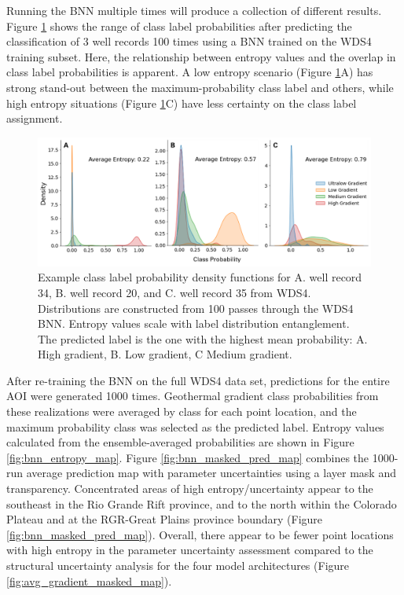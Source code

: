 Running the BNN multiple times will produce a collection of different results. Figure \ref{fig:bnn_class_pdfs} shows the range of class label probabilities after predicting the classification of 3 well records 100 times using a BNN trained on the WDS4 training subset. Here, the relationship between entropy values and the overlap in class label probabilities is apparent. A low entropy scenario (Figure \ref{fig:bnn_class_pdfs}A) has strong stand-out between the maximum-probability class label and others, while high entropy situations (Figure \ref{fig:bnn_class_pdfs}C) have less certainty on the class label assignment.

\begin{figure}[!htp]
\centering
\includegraphics[width=\textwidth]{templates/images/Figure-BNN_100trials_WDS4.png}
\caption[Bayesian neural network class pdfs]{Example class label probability density functions for A. well record 34, B. well record 20, and C. well record 35 from WDS4. Distributions are constructed from 100 passes through the WDS4 BNN. Entropy values scale with label distribution entanglement. The predicted label is the one with the highest mean probability: A. High gradient, B. Low gradient, C Medium gradient.}
\label{fig:bnn_class_pdfs}
\end{figure}

After re-training the BNN on the full WDS4 data set, predictions for the entire AOI were generated 1000 times. Geothermal gradient class probabilities from these realizations were averaged by class for each point location, and the maximum probability class was selected as the predicted label. Entropy values calculated from the ensemble-averaged probabilities are shown in Figure \ref{fig:bnn_entropy_map}. Figure \ref{fig:bnn_masked_pred_map} combines the 1000-run average prediction map with parameter uncertainties using a layer mask and transparency. Concentrated areas of high entropy/uncertainty appear to the southeast in the Rio Grande Rift province, and to the north within the Colorado Plateau and at the RGR-Great Plains province boundary (Figure \ref{fig:bnn_masked_pred_map}). Overall, there appear to be fewer point locations with high entropy in the parameter uncertainty assessment compared to the structural uncertainty analysis for the four model architectures (Figure \ref{fig:avg_gradient_masked_map}).

